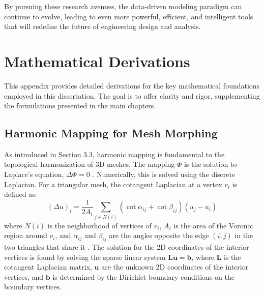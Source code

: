 \documentclass[dscexam, EN]{ufabcFHZh}
\begin{document}
By pursuing these research avenues, the data-driven modeling paradigm can continue to evolve, leading to even more powerful, efficient, and intelligent tools that will redefine the future of engineering design and analysis.

\backmatter

%

%

%

\appendix
\chapter{Mathematical Derivations}
\label{app:math_derivations}

This appendix provides detailed derivations for the key mathematical foundations employed in this dissertation. The goal is to offer clarity and rigor, supplementing the formulations presented in the main chapters.

\section{Harmonic Mapping for Mesh Morphing}
\label{sec:harmonic_mapping_derivation}

As introduced in Section 3.3, harmonic mapping is fundamental to the topological harmonization of 3D meshes. The mapping $\Phi$ is the solution to Laplace's equation, $\Delta\Phi=0$ \cite{[1]}. Numerically, this is solved using the discrete Laplacian. For a triangular mesh, the cotangent Laplacian at a vertex $v_i$ is defined as:
\begin{equation}
    (\Delta u)_i = \frac{1}{2A_i} \sum_{j \in N(i)} (\cot \alpha_{ij} + \cot \beta_{ij})(u_j - u_i)
\end{equation}
where $N(i)$ is the neighborhood of vertices of $v_i$, $A_i$ is the area of the Voronoi region around $v_i$, and $\alpha_{ij}$ and $\beta_{ij}$ are the angles opposite the edge $(i, j)$ in the two triangles that share it \cite{[1]}. The solution for the 2D coordinates of the interior vertices is found by solving the sparse linear system $\mathbf{L}\mathbf{u} = \mathbf{b}$, where $\mathbf{L}$ is the cotangent Laplacian matrix, $\mathbf{u}$ are the unknown 2D coordinates of the interior vertices, and $\mathbf{b}$ is determined by the Dirichlet boundary conditions on the boundary vertices.
\end{document}
